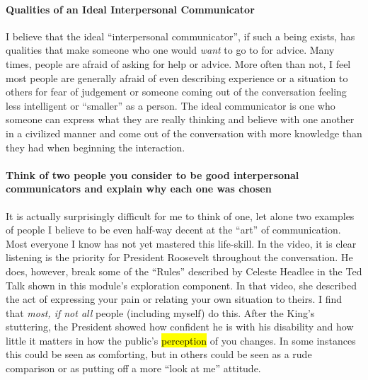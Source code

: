\documentclass[stu,12pt]{apa7}
\begin{document}
    \paragraph{Qualities of an Ideal Interpersonal Communicator}
      I believe that the ideal ``interpersonal communicator'', if such a being
        exists, has qualities that make someone who one would \textit{want}
        to go to for advice. Many times, people are afraid of asking for help
        or advice. More often than not, I feel most people are generally afraid
        of even describing experience or a situation to others for fear of
        judgement or someone coming out of the conversation feeling less
        intelligent or ``smaller'' as a person. The ideal communicator is one
        who someone can express what they are really thinking and believe with
        one another in a civilized manner and come out of the conversation
        with more knowledge than they had when beginning the interaction.

    \paragraph{Think of two people you consider to be good interpersonal
      communicators and explain why each one was chosen}
      It is actually surprisingly difficult for me to think of one, let alone
        two examples of people I believe to be even half-way decent at the
        ``art'' of communication. Most everyone I know has not yet mastered
        this life-skill. In the video, it is clear listening is the priority
        for President Roosevelt throughout the conversation. He does, however,
        break some of the ``Rules'' described by Celeste Headlee in the Ted Talk
        shown in this module's exploration component. In that video, she
        described the act of expressing your pain or relating your own situation
        to theirs. I find that \emph{most, if not all} people (including myself)
        do this. After the King's stuttering, the President showed how confident
        he is with his disability and how little it matters in how the public's
        \hl{perception} of you changes. In some instances this could be seen as
        comforting, but in others could be seen as a rude comparison or as
        putting off a more ``look at me'' attitude.

\end{document}
